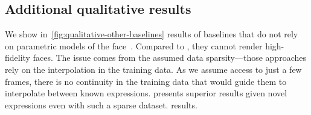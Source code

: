   \subsection{Additional qualitative results}

    We show in~\cref{fig:qualitative-other-baselines} results of baselines
    that do not rely on parametric models of the face~\cite{li2017flame}.
    Compared to \blendfields, they cannot render high-fidelity faces.
    The issue comes from the assumed data sparsity---those approaches rely on
    the interpolation in the training data.
    As we assume access to just a few frames, there is no continuity in the
    training data that would guide them to interpolate between known
    expressions.
    \blendfields presents superior results given novel expressions even with such a sparse dataset.
    results.

    \clearpage
    
    